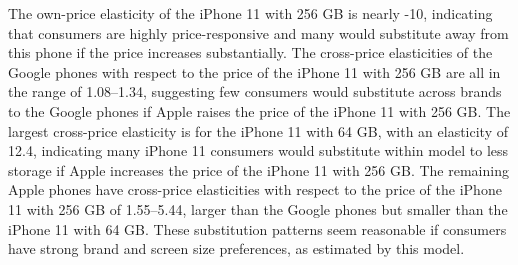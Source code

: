 \documentclass[11pt,letterpaper]{article}\usepackage[]{graphicx}\usepackage[]{color}
\begin{document}
\begin{enumerate}[label=\alph*., leftmargin=*]
	The own-price elasticity of the iPhone 11 with 256 GB is nearly -10, indicating that consumers are highly price-responsive and many would substitute away from this phone if the price increases substantially. The cross-price elasticities of the Google phones with respect to the price of the iPhone 11 with 256 GB are all in the range of 1.08--1.34, suggesting few consumers would substitute across brands to the Google phones if Apple raises the price of the iPhone 11 with 256 GB. The largest cross-price elasticity is for the iPhone 11 with 64 GB, with an elasticity of 12.4, indicating many iPhone 11 consumers would substitute within model to less storage if Apple increases the price of the iPhone 11 with 256 GB. The remaining Apple phones have cross-price elasticities with respect to the price of the iPhone 11 with 256 GB of 1.55--5.44, larger than the Google phones but smaller than the iPhone 11 with 64 GB. These substitution patterns seem reasonable if consumers have strong brand and screen size preferences, as estimated by this model.
\end{enumerate}
\end{document}
